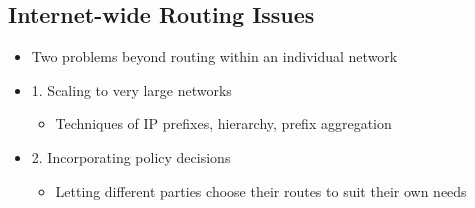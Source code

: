 \documentclass[12pt]{ctexart}   %
\begin{document}
	\subsection{Internet-wide Routing Issues}
	\begin{itemize}
		\item Two problems beyond routing within an individual network
		\item {\color{blue} 1.} Scaling to very large networks
		\begin{itemize}
			\item Techniques of IP prefixes, hierarchy, prefix aggregation
		\end{itemize}
		
		\item {\color{blue} 2.} Incorporating policy decisions
		\begin{itemize}
			\item Letting different parties choose their routes to suit their own needs
		\end{itemize}
	\end{itemize}
	
\end{document}
